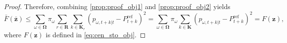 \documentclass[10pt,a4paper]{amsart}
\begin{document}
\begin{proof}
Therefore, combining \eqref{prop:proof_obj1} and \eqref{prop:proof_obj2} yields
\begin{equation}
\bar{F}(\boldsymbol{\bar{z}}) \leq
\sum_{\omega \in \boldsymbol{\Omega}}
\pi_{\omega}
\sum_{r \in \boldsymbol{R}} \sum_{k \in \boldsymbol{K}_r}
\left(p_{\omega,t+k|t} - P^{\mathrm{ref}}_{t+k}\right)^2
=
\sum_{\omega \in \boldsymbol{\Omega}} \pi_{\omega} \sum_{k \in \boldsymbol{K}}
\left(p_{\omega,t+k|t} - P^{\mathrm{ref}}_{t+k}\right)^2
=
F(\boldsymbol{z}),
\end{equation}
where $F(\boldsymbol{z})$ is defined in \eqref{eq:cen_sto_obj}.
\end{proof}
\end{document}
